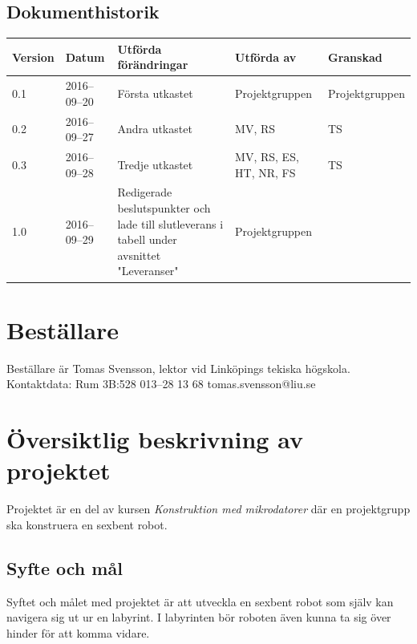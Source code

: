 \documentclass[a4paper,titlepage,12pt]{article}
\begin{document}
\begin{center}

		\section*{Dokumenthistorik}
		\renewcommand*{\arraystretch}{1.4}
        \begin{longtable}[c]{ l l >{\raggedright}p{5cm} >{\raggedright}p{3cm} l }
			\textbf{Version} & \textbf{Datum} & \textbf{Utförda förändringar} 
			& \textbf{Utförda av} & \textbf{Granskad} \\ \midrule

			0.1 & 2016--09--20 & Första utkastet & Projektgruppen & Projektgruppen\\
			0.2 & 2016--09--27 & Andra utkastet & MV, RS & TS \\
			0.3 & 2016--09--28 & Tredje utkastet & MV, RS, ES, HT, NR, FS & TS \\
			1.0 & 2016--09--29 & Redigerade beslutspunkter och lade till
            slutleverans i tabell under avsnittet "Leveranser" & Projektgruppen & \\
		\end{longtable}
	\end{center}

	\newpage

	\section{Beställare}
	Beställare är Tomas Svensson, lektor vid Linköpings tekiska högskola. \\
  Kontaktdata: Rum 3B:528 013–28 13 68 tomas.svensson@liu.se


	\section{Översiktlig beskrivning av projektet}
	Projektet är en del av kursen \textit{Konstruktion med mikrodatorer} där en
  projektgrupp ska konstruera en sexbent robot. 

	\subsection{Syfte och mål}
	Syftet och målet med projektet är att utveckla en sexbent robot som själv
	kan navigera sig ut ur en labyrint. I labyrinten bör roboten även kunna ta
	sig över hinder för att komma vidare.
\end{document}
